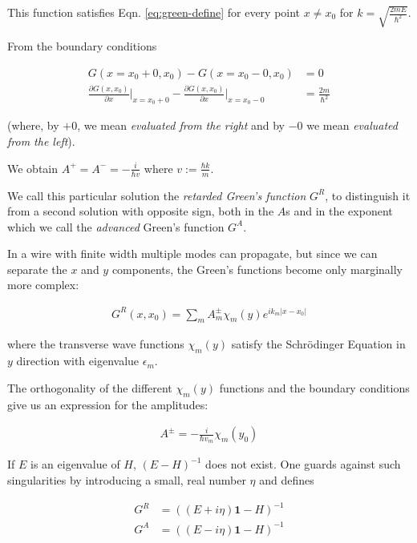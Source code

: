 \documentclass[11pt,twoside]{book}
\begin{document}
This function satisfies Eqn. \ref{eq:green-define} for every point $x \not=
x_0$  for $ k = \sqrt{\frac{2mE}{\hbar^2}}$.

From the boundary conditions

\begin{align}
    G(x = x_0 + 0, x_0) - G(x = x_0 - 0, x_0) &= 0 \\
    \frac{\partial G(x, x_0)}{\partial x}\left.\right|_{x=x_0 +0}
    -\frac{\partial G(x, x_0)}{\partial x}\left.\right|_{x=x_0 -0}
        &= \frac{2m}{\hbar^2}
\end{align}

(where, by $+0$, we mean \emph{evaluated from the right} and by $-0$ we mean
\emph{evaluated from the left}).

We obtain $A^+ = A^- = -\frac{i}{\hbar v}$ where $v := \frac{\hbar k}{m} $.

We call this particular solution the \emph{retarded Green's function} $G^R$,
to distinguish it from a second solution with opposite sign, both in the $A$s
and in the exponent which we call the \emph{advanced} Green's function $G^A$.

In a wire with finite width multiple modes can propagate, but since we can
separate the $x$ and $y$ components, the Green's functions become only
marginally more complex:

\begin{align}
    G^R(x, x_0) = \sum_m A^\pm_m \chi_m(y) e^{i k_m |x - x_0|}
\end{align}

where the transverse wave functions $\chi_m(y)$ satisfy the Schrödinger
Equation in $y$ direction with eigenvalue $\epsilon_m$.

The orthogonality of the different $\chi_m(y)$ functions and the boundary
conditions give us an expression for the amplitudes:

\begin{align}
    A^\pm = - \frac{i}{\hbar v_m} \chi_m(y_0)
\end{align}

If $E$ is an eigenvalue of $H$, $(E-H)^{-1}$ does not exist. One guards
against such singularities by introducing a small, real number $\eta$ and
defines

\begin{align}
    G^R &= \left( (E + i \eta)\mathbf{1} - H \right)^{-1}\\
    G^A &= \left( (E - i \eta)\mathbf{1} - H \right)^{-1}
\end{align}
\end{document}
